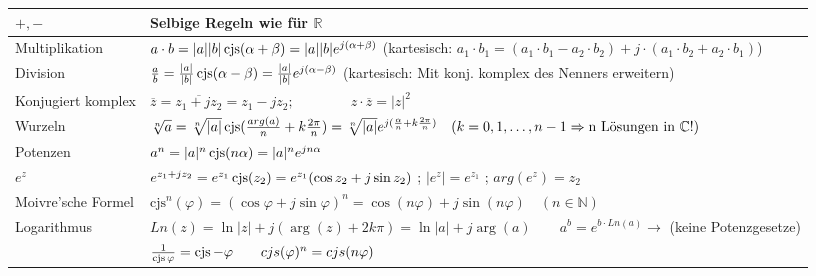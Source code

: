 \vspace{-\baselineskip}
\renewcommand{\arraystretch}{1.5}
\begin{tabular}{| l | l |}
\hline
	$+, -$
	& Selbige Regeln wie für $\mathbb{R}$\\

\hline
	Multiplikation
	&$a \cdot b = 
		|a| |b| \operatorname{cjs}(\alpha + \beta) = 
		|a| |b| e^{j(\alpha + \beta)}$ (kartesisch: $a_1 \cdot b_1 = (a_1 \cdot b_1 - a_2 \cdot b_2) + j \cdot (a_1 \cdot b_2 + a_2 \cdot b_1)$)\\

\hline
	Division
	&$\frac{a}{b} = 
		\frac{\left|a\right|}{\left|b\right|} \operatorname{cjs}(\alpha - \beta) =
		\frac{\left|a\right|}{\left|b\right|} e^{j(\alpha - \beta)}$ (kartesisch: Mit
		konj. komplex des Nenners erweitern) \\

\hline
	Konjugiert komplex
	&$\overline{z} = \overline{z_1 + jz_2} = z_1 - jz_2; \qquad \qquad z \cdot \overline{z} = |z|^2$\\

\hline
	Wurzeln
	&$\sqrt[n]{a} = \sqrt[n]{|a|} \operatorname{cjs}(\frac{arg(a)}{n}+k\frac{2\pi}{n}) = 
	\sqrt[n]{|a|} e^{j(\frac{\alpha}{n} + k \frac{2\pi}{n})} \quad (k = 0, 1,
	\ldots, n-1 \Rightarrow \text{n Lösungen in } \mathbb{C} !)$ \\

\hline
	Potenzen
	&$a^n = |a|^n \operatorname{cjs}(n\alpha) = 
	|a|^n e^{jn\alpha}$\\

\hline
	$e^z$ &$e^{z_1+jz_2} = e^{z_1} \operatorname{cjs}(z_2) = e^{z_1} (\cos{z_2} + j\sin{z_2})$ ; $|e^z| = e^{z_1}$ ; $arg(e^z) = z_2$\\
	
\hline
	Moivre'sche Formel
	&$\text{cjs}^n(\varphi) =
	(\cos{\varphi} + j\sin{\varphi})^n = 
	\cos(n\varphi) +j\sin(n\varphi) \quad (n \in \mathbb{N})$\\

\hline
	Logarithmus
	&$Ln(z) = \ln{|z|} + j (\arg(z) + 2k \pi)=\ln|a|+j\arg(a) \qquad a^b = e^{b\cdot Ln(a)} \rightarrow$ (keine Potenzgesetze) \\

\hline
	& $\frac{1}{\operatorname{cjs}{\varphi}} = \operatorname{cjs}{-\varphi} \qquad cjs(\varphi)^n = cjs(n\varphi)$ \\
\hline
\end{tabular}
\renewcommand{\arraystretch}{1}\\

